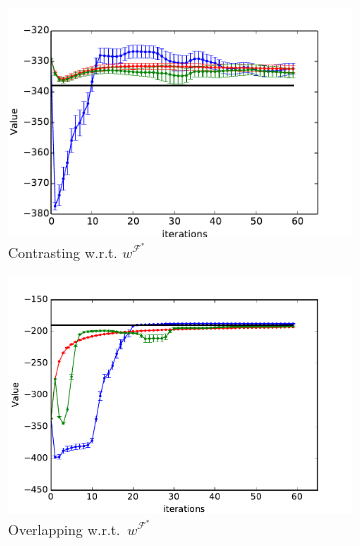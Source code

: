 \documentclass{aamas2016}
\begin{document}
\begin{figure}[t]
    \hspace{-7mm}
  \begin{subfigure}[t]{0.55\columnwidth}
    \includegraphics[clip=true,width=1.5\textwidth]{images/taboo_apprentice_contrastive.pdf}
    \caption{Contrasting w.r.t. $w^{\mathcal{F}^*}$}
    \label{fig:toy_taboo_apprentice_contrastive}
   \end{subfigure}
   \hspace{15mm}
   \begin{subfigure}[t]{0.55\columnwidth}
    \includegraphics[trim=0.6cm 0.0cm 0.0cm 0.0cm,clip=true,width=1.45\textwidth]{images/over_taboo_apprentice.pdf}
    \caption{Overlapping w.r.t.\ $w^{\mathcal{F}^*}$}
    \label{fig:toy_taboo_apprentice_overlapping}
    \end{subfigure}
    \hspace{13mm}
    \begin{subfigure}[t]{0.55\columnwidth}

\end{subfigure}
\end{figure}
\end{document}
